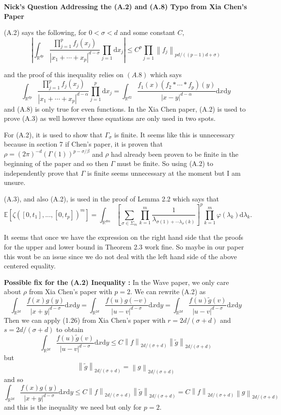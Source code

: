 \documentclass[a4paper,11pt]{article}
\numberwithin{equation}{section}
\theoremstyle{plain}
\theoremstyle{definition}
\newcommand{\ud}{\ensuremath{\mathrm{d} }}
\newcommand{\Norm}[1]{\left\|  #1   \right\|}
\newcommand{\R}{\mathbb{R}}
\newcounter{NQ}
\newenvironment{NickQuestion}[1][] %
{\refstepcounter{NQ}
	\begin{mdframed}[backgroundcolor=lightgray]\textbf{Nick's Question \theNQ \: #1~~}~~~\noindent}%
	{\end{mdframed}}
\numberwithin{NQ}{section}
\numberwithin{LQ}{section}
\numberwithin{ZQ}{section}
\begin{document}
	\begin{NickQuestion}[Addressing the (A.2) and (A.8) Typo from Xia Chen's Paper]

		(A.2) says the following, for $0 < \sigma < d$ and some constant $C$,
		\[
		\left| \int_{\R^{dp}} \dfrac{\prod_{j =1}^p f_j(x_j)}{|x_1+\cdots+x_p|^{d-\sigma}} \prod_{j =1} \ud x_j \right| \le C^p \prod_{j =1}\Norm{f_j}_{pd/((p-1)d+\sigma)}
		\]

		and the proof of this inequality relies on $(A.8)$ which says
		\[
		\int_{\R^{dp}}\frac{\prod_{j = 1}^pf_j(x_j)}{|x_1+\cdots+x_p|^{d-\alpha}} \prod_{j = 1}^p \ud x_j =
		\int_{\R^{d2}}\frac{f_1(x)(f_2*\cdots * f_p)(y)}{|x-y|^{d-\alpha}}  \ud x \ud y
		\]
		and (A.8) is only true for even functions. In the Xia Chen paper, (A.2) is used to prove (A.3) as well however these equations are only used in two spots.

		For (A.2), it is used to show that $\Gamma_\sigma$ is finite. It seems like this is unnecessary because in section 7 if Chen's paper, it is proven that  $\rho = (2\pi)^{-d}(\Gamma(1))^{p-\sigma/\beta}$ and $\rho$ had already been proven to be finite in the beginning of the paper and so then $\Gamma$ must be finite. So using (A.2) to independently prove that $\Gamma$ is finite seems unnecessary at the moment but I am unsure.

		(A.3), and also (A.2),  is used in the proof of Lemma 2.2 which says that
		\[
		\mathbb{E} \left[ \zeta([0,t_1],...,[0,t_p])^m \right] = \int_{\R^{dm}} \left[ \sum_{\sigma \in \Sigma_m} \prod_{k=1}^m\frac{1}{\lambda_{\sigma(1)+ \cdots \lambda_\sigma(k)}} \right]^p\prod_{k=1}^m \varphi(\lambda_k) \ud \lambda_k.
		\]

		It seems that once we have the expression on the right hand side that the proofs for the upper and lower bound in Theorem 2.3 work fine. So maybe in our paper this wont be an issue since we do not deal with the left hand side of the above centered equality.

		\noindent	\textbf{Possible fix for the (A.2) Inequality :} In the Wave paper, we only care about $\rho$ from Xia Chen's paper with $p=2$. We can rewrite (A.2) as
		\[
		\int_{\R^{2d}} \frac{f(x)g(y)}{|x+y|^{d-\sigma}} \ud x \ud y = 	\int_{\R^{2d}} \frac{f(u)g(-v)}{|u-v|^{d-\sigma}} \ud x \ud y =	\int_{\R^{2d}} \frac{f(u)\tilde{g}(v)}{|u-v|^{d-\sigma}} \ud x \ud y
		\]
		Then we can apply (1.26) from Xia Chen's paper with $r=2d/(\sigma+d)$ and $s=2d/(\sigma +d)$ to obtain
		\[
		\int_{\R^{2d}} \frac{f(u)\tilde{g}(v)}{|u-v|^{d-\sigma}} \ud x \ud y \le C \Norm{f}_{2d/(\sigma+d)} \Norm{\tilde{g}}_{2d/(\sigma+d)}
		\]
		but
		\[
		\Norm{\tilde{g}}_{2d/(\sigma+d)} = \Norm{g}_{2d/(\sigma+d)}
		\]
		and so
		\[
		\int_{\R^{2d}} \frac{f(x)g(y)}{|x+y|^{d-\sigma}} \ud x \ud y \le C \Norm{f}_{2d/(\sigma+d)} \Norm{\tilde{g}}_{2d/(\sigma+d)} = C \Norm{f}_{2d/(\sigma+d)} \Norm{g}_{2d/(\sigma+d)}
		\]
		and this is the inequality we need but only for $p=2$.
	\end{NickQuestion}
\end{document}
